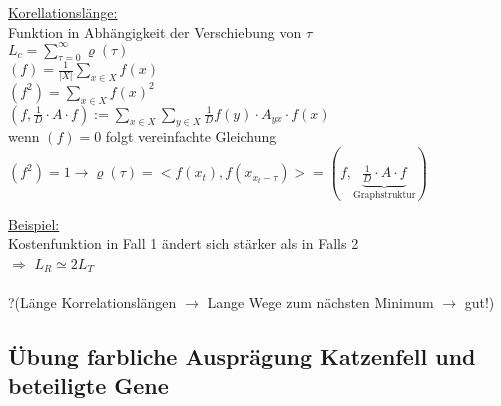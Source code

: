 \underline{Korellationslänge:}\\

Funktion in Abhängigkeit der Verschiebung von $\tau$\\
$L_c=\displaystyle \sum_{\tau=0}^{\infty} \varrho(\tau)$\\
$(f) = \frac{1}{|X|} \sum_{x\in X} f(x)$\\
$(f^2) = \sum_{x \in X} f(x)^2$\\
$(f, \frac{1}{D}\cdot A \cdot f) := \sum_{x \in X} \sum_{y \in X} \frac{1}{D} f(y) \cdot A_{yx} \cdot f(x)$\\
wenn $(f)=0$ folgt vereinfachte Gleichung\\
$(f^2)=1 \rightarrow \varrho(\tau)= <f(x_t), f(x_{x_t - \tau})> = (f, \underbrace{\frac{1}{D} \cdot A \cdot f}_{\text{Graphstruktur}})$ 

\underline{Beispiel:}\\

Kostenfunktion in Fall 1 ändert sich stärker als in Falls 2\\
$\Rightarrow$ $L_R \simeq 2 L_T$\\\\

?(Länge Korrelationslängen $\rightarrow$ Lange Wege zum nächsten Minimum $\rightarrow$ gut!)

\subsection{Übung farbliche Ausprägung Katzenfell und beteiligte Gene}